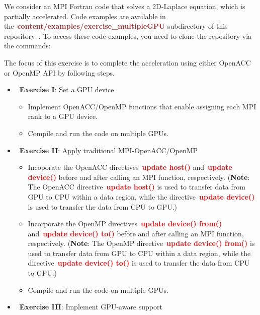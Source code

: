 \par
We consider an MPI Fortran code that solves a 2D-Laplace equation, which is partially accelerated.
Code examples are available in the~\textbf{\textcolor{brown}{content/examples/exercise\_multipleGPU}} subdirectory of this repository~\cite{gpu-programming-examples}.
To access these code examples, you need to clone the repository via the commands:

The focus of this exercise is to complete the acceleration using either OpenACC or OpenMP API by following steps.


\begin{itemize}
    \item~\textbf{Exercise I}: Set a GPU device
    \begin{itemize}
        \item Implement OpenACC/OpenMP functions that enable assigning each MPI rank to a GPU device.
        \item Compile and run the code on multiple GPUs.
    \end{itemize}
    \item~\textbf{Exercise II}: Apply traditional MPI-OpenACC/OpenMP
    \begin{itemize}
        \item Incoporate the OpenACC directives~\textbf{\textcolor{red}{update host()}} and~\textbf{\textcolor{red}{update device()}} before and after calling an MPI function, respectively. (\textbf{Note}: The OpenACC directive~\textbf{\textcolor{red}{update host()}} is used to transfer data from GPU to CPU within a data region, while the directive~\textbf{\textcolor{red}{update device()}} is used to transfer the data from CPU to GPU.)
        \item Incorporate the OpenMP directives~\textbf{\textcolor{red}{update device() from()}} and~\textbf{\textcolor{red}{update device() to()}} before and after calling an MPI function, respectively. (\textbf{Note}: The OpenMP directive~\textbf{\textcolor{red}{update device() from()}} is used to transfer data from GPU to CPU within a data region, while the directive~\textbf{\textcolor{red}{update device() to()}} is used to transfer the data from CPU to GPU.)
        \item Compile and run the code on multiple GPUs.
    \end{itemize}
    \item~\textbf{Exercise III}: Implement GPU-aware support

\end{itemize}
